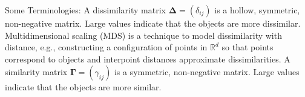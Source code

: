 \documentclass[professionalfonts,hyperref={pdfpagelabels=false,colorlinks=true,linkcolor=red}]{beamer}
\begin{document}

\begin{frame}{Some Terminologies:}
  A \alert{dissimilarity matrix} $\bm{\Delta} = (\delta_{ij})$
  is a hollow, symmetric, non-negative matrix. Large values indicate that the objects are
  more dissimilar.  
\vskip5pt \alert{Multidimensional scaling} (MDS) is a
  technique to model dissimilarity with distance, e.g., constructing a
  configuration of points in $\mathbb{R}^{d}$ so that points correspond to objects and interpoint
  distances approximate dissimilarities.
\vskip5pt A \alert{similarity matrix} $\bm{\Gamma} =
  (\gamma_{ij})$ is a symmetric, non-negative matrix. Large values indicate that the objects are
  more similar.
  

\end{frame}
\end{document}
